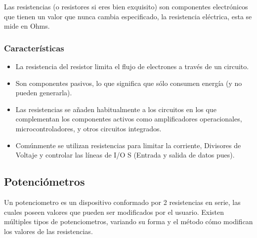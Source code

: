 \documentclass[12pt, fleqn]{article}                            %
\theoremstyle{break}                                            %
\begin{document}
            Las resistencias (o resistores si eres bien exquisito) son componentes electrónicos
            que tienen un valor que nunca cambia especificado, la resistencia eléctrica,
            esta se mide en Ohms.

        \subsubsection{Características}

            \begin{itemize}
                \item La resistencia del resistor limita el flujo de electrones a
                    través de un circuito.

                \item Son componentes pasivos, lo que significa que sólo consumen energía 
                (y no pueden generarla).

                \item Las resistencias se añaden habitualmente a los circuitos en los que
                complementan los componentes activos como amplificadores operacionales,
                microcontroladores, y otros circuitos integrados.

                \item  Comúnmente se utilizan resistencias para limitar la corriente,
                Divisores de Voltaje y controlar las líneas de I/O S (Entrada y salida
                de datos pues).
            \end{itemize}



    \vspace{1em}
    \subsection{Potenciómetros}

        Un potenciometro es un dispositivo conformado por 2 resistencias en serie,
        las cuales poseen valores que pueden ser modificados por el usuario.
        Existen múltiples tipos de potenciometros, variando su forma y el método
        cómo modifican los valores de las resistencias. 
\end{document}
